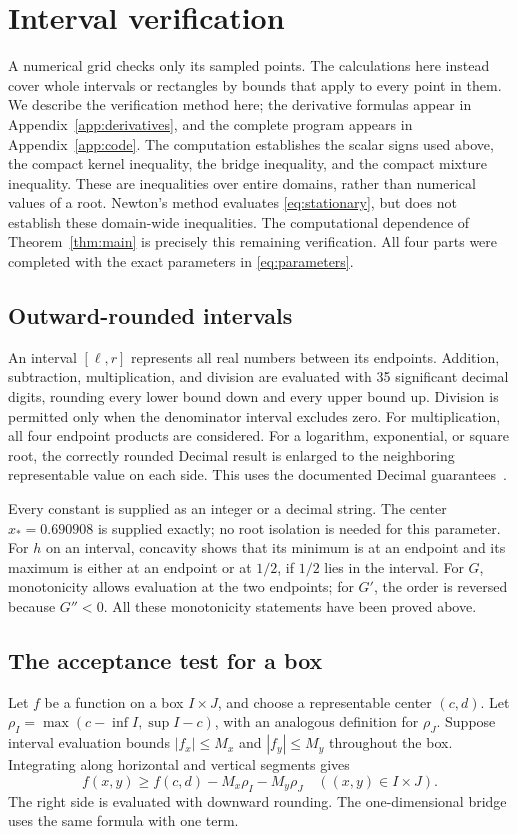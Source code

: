 \documentclass[11pt]{article}
\theoremstyle{remark}
\begin{document}
\section{Interval verification}\label{sec:certificates}

A numerical grid checks only its sampled points. The calculations
here instead cover whole intervals or rectangles by bounds that
apply to every point in them. We describe the verification method here;
the derivative formulas appear in Appendix~\ref{app:derivatives}, and
the complete program appears in Appendix~\ref{app:code}.
The computation establishes the scalar signs used above, the compact
kernel inequality, the bridge inequality, and the compact mixture
inequality. These are inequalities over entire domains, rather than
numerical values of a root. Newton's method evaluates
\eqref{eq:stationary}, but does not establish these domain-wide
inequalities. The computational dependence of Theorem~\ref{thm:main}
is precisely this remaining verification. All four parts were completed with the exact parameters
in \eqref{eq:parameters}.

\subsection{Outward-rounded intervals}
An interval \([\ell,r]\) represents all real numbers between its
endpoints. Addition, subtraction, multiplication, and division
are evaluated with 35 significant decimal digits, rounding every
lower bound down and every upper bound up. Division is permitted
only when the denominator interval excludes zero.
For multiplication, all four endpoint products are considered.
For a logarithm, exponential, or square root, the correctly
rounded Decimal result is enlarged to the neighboring representable
value on each side. This uses the documented Decimal
guarantees~\cite{decimal}.

Every constant is supplied as an integer or a decimal string.
The center \(x_*=0.690908\) is supplied exactly; no root
isolation is needed for this parameter.
For \(h\) on an interval, concavity shows that its minimum is at
an endpoint and its maximum is either at an endpoint or at
\(1/2\), if \(1/2\) lies in the interval.
For \(G\), monotonicity allows evaluation at the two endpoints;
for \(G'\), the order is reversed because \(G''<0\).
All these monotonicity statements have been proved above.

\subsection{The acceptance test for a box}
Let \(f\) be a function on a box
\(I\times J\), and choose a representable center \((c,d)\).
Let \(\rho_I=\max(c-\inf I,\sup I-c)\), with an analogous
definition for \(\rho_J\). Suppose interval evaluation bounds
\(|f_x|\le M_x\) and \(|f_y|\le M_y\) throughout the box.
Integrating along horizontal and vertical segments gives
\begin{equation}\label{eq:meanvalue}
f(x,y)\ge f(c,d)-M_x\rho_I-M_y\rho_J
\quad((x,y)\in I\times J).
\end{equation}
The right side is evaluated with downward rounding.
The one-dimensional bridge uses the same formula with one term.
\end{document}

